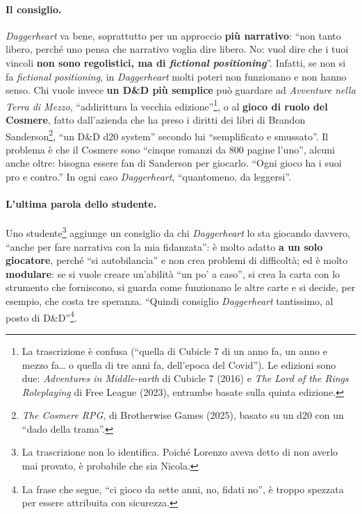 \paragraph{Il consiglio.} \emph{Daggerheart} va bene, soprattutto per un approccio \textbf{più
narrativo}: ``non tanto libero, perché uno pensa che narrativo voglia dire libero. No: vuol dire che i
tuoi vincoli \textbf{non sono regolistici, ma di \emph{fictional positioning}}''. Infatti, se non si fa
\emph{fictional positioning}, in \emph{Daggerheart} molti poteri non funzionano e non hanno senso. Chi
vuole invece \textbf{un D\&D più semplice} può guardare ad \emph{Avventure nella Terra di Mezzo},
``addirittura la vecchia edizione''\footnote{La trascrizione è confusa (``quella di Cubicle 7 di un anno
fa, un anno e mezzo fa\ldots{} o quella di tre anni fa, dell'epoca del Covid''). Le edizioni sono due:
\emph{Adventures in Middle-earth} di Cubicle 7 (2016) e \emph{The Lord of the Rings Roleplaying} di Free
League (2023), entrambe basate sulla quinta edizione.}, o al \textbf{gioco di ruolo del Cosmere}, fatto
dall'azienda che ha preso i diritti dei libri di Brandon Sanderson\footnote{\emph{The Cosmere RPG}, di
Brotherwise Games (2025), basato su un d20 con un ``dado della trama''.}, ``un D\&D d20 system'' secondo
lui ``semplificato e smussato''. Il problema è che il Cosmere sono ``cinque romanzi da 800 pagine
l'uno'', alcuni anche oltre: bisogna essere fan di Sanderson per giocarlo. ``Ogni gioco ha i suoi pro e
contro.'' In ogni caso \emph{Daggerheart}, ``quantomeno, da leggersi''.

\paragraph{L'ultima parola dello studente.} Uno studente\footnote{La trascrizione non lo identifica.
Poiché Lorenzo aveva detto di non averlo mai provato, è probabile che sia Nicola.} aggiunge un consiglio
da chi \emph{Daggerheart} lo sta giocando davvero, ``anche per fare narrativa con la mia fidanzata'': è
molto adatto \textbf{a un solo giocatore}, perché ``si autobilancia'' e non crea problemi di difficoltà;
ed è molto \textbf{modulare}: se si vuole creare un'abilità ``un po' a caso'', si crea la carta con lo
strumento che forniscono, si guarda come funzionano le altre carte e si decide, per esempio, che costa
tre speranza. ``Quindi consiglio \emph{Daggerheart} tantissimo, al posto di D\&D''\footnote{La frase
che segue, ``ci gioco da sette anni, no, fidati no'', è troppo spezzata per essere attribuita con
sicurezza.}.


